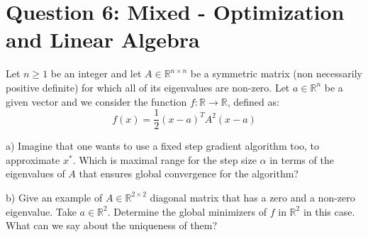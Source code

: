 \documentclass[12pt]{article}
\begin{document}
	\section*{Question 6: Mixed - Optimization and Linear Algebra \cite{q4}}
		Let $n \geq 1$ be an integer and let $A \in \mathbb{R}^{n \times n}$ be a symmetric matrix (non necessarily positive definite) for which all of its eigenvalues are non-zero. Let $a \in \mathbb{R}^n$ be a given vector and we consider the function $f:\mathbb{R} \rightarrow \mathbb{R}$, defined as:
	\begin{equation}
		f(x) = \frac{1}{2}(x-a)^TA^2(x-a)
	\end{equation}
	
	a) Imagine that one wants to use a fixed step gradient algorithm too, to approximate $x^*$. Which is maximal range for the step size $\alpha$ in terms of the eigenvalues of $A$ that ensures global convergence for the algorithm?
	
	b) Give an example of $A \in \mathbb{R}^{2 \times 2}$ diagonal matrix that has a zero and a non-zero eigenvalue. Take $a \in \mathbb{R}^2$. Determine the global minimizers of $f$ in $\mathbb{R}^2$ in this case. What can we say about the uniqueness of them?
	
\end{document}
